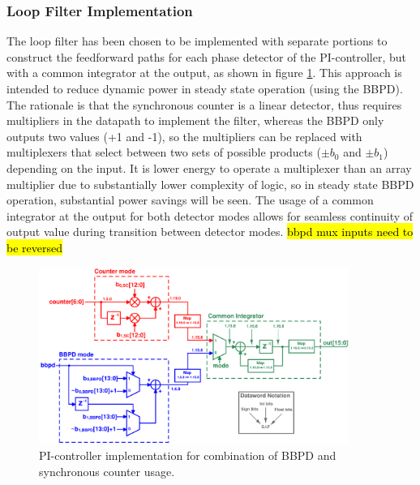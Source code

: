 

		\subsubsection{Loop Filter Implementation}
			The loop filter has been chosen to be implemented with separate portions to construct the feedforward paths for each phase detector of the PI-controller, but with a common integrator at the output, as shown in figure \ref{fig:pi_dig_imp}. This approach is intended to reduce dynamic power in steady state operation (using the BBPD). The rationale is that the synchronous counter is a linear detector, thus requires multipliers in the datapath to implement the filter, whereas the BBPD only outputs two values (+1 and -1), so the multipliers can be replaced with multiplexers that select between two sets of possible products ($\pm b_0$ and $\pm b_1$) depending on the input. It is lower energy to operate a multiplexer than an array multiplier due to substantially lower complexity of logic, so in steady state BBPD operation, substantial power savings will be seen. The usage of a common integrator at the output for both detector modes allows for seamless continuity of output value during transition between detector modes. \hl{bbpd mux inputs need to be reversed}
			\begin{figure}[htb!]
			        \centering
			        \includegraphics[width=0.9\textwidth, angle=0]{./figs/design/mux_datapath}
			    \caption{PI-controller implementation for combination of BBPD and synchronous counter usage.}
			    \label{fig:pi_dig_imp}
			\end{figure}

